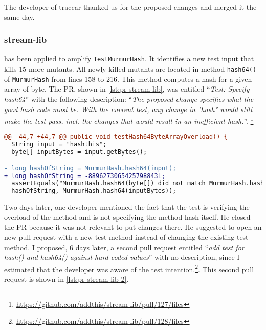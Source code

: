 The developer of traccar thanked us for the proposed changes and merged it the same day.

\subsubsection{stream-lib}

\dspot has been applied to amplify \texttt{TestMurmurHash}. 
It identifies a new test input that kills 15 more mutants.
All newly killed mutants are located in method \texttt{hash64()} of \texttt{MurmurHash} from lines 158 to 216.
This method computes a hash for a given array of byte. 
The PR, shown in \autoref{lst:pr-stream-lib}, was entitled ``\emph{Test: Specify hash64}'' with the following description: ``\emph{The proposed change specifies what the good hash code must be. With the current test, any change in "hash" would still make the test pass, incl. the changes that would result in an inefficient hash.}''. \footnote{\url{https://github.com/addthis/stream-lib/pull/127/files}}

\begin{lstlisting}[language=diff,caption=Test-improvement proposed to stream-lib developers.,label=lst:pr-stream-lib]
@@ -44,7 +44,7 @@ public void testHash64ByteArrayOverload() {
  String input = "hashthis";
  byte[] inputBytes = input.getBytes();

- long hashOfString = MurmurHash.hash64(input);
+ long hashOfString = -8896273065425798843L;
  assertEquals("MurmurHash.hash64(byte[]) did not match MurmurHash.hash64(String)",
  hashOfString, MurmurHash.hash64(inputBytes));
\end{lstlisting}

Two days later, one developer mentioned the fact that the test is verifying the overload of the method and is not specifying the method hash itself. 
He closed the PR because it was not relevant to put changes there. 
He suggested to open an new pull request with a new test method instead of changing the existing test method. 
I proposed, 6 days later, a second pull request entitled ``\emph{add test for hash() and hash64() against hard coded values}'' with no description, since I estimated that the developer was aware of the test intention.\footnote{\url{https://github.com/addthis/stream-lib/pull/128/files}}.
This second pull request is shown in \autoref{lst:pr-stream-lib-2}.

